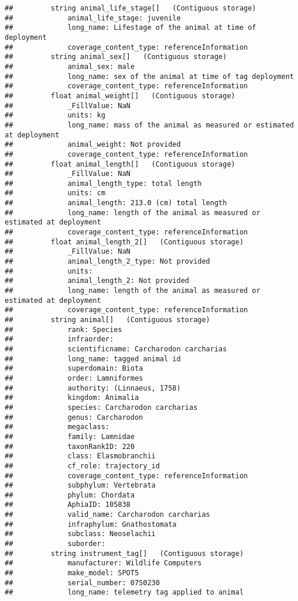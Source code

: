 \documentclass[
]{book}
\begin{document}
\begin{verbatim}
##         string animal_life_stage[]   (Contiguous storage)  
##             animal_life_stage: juvenile
##             long_name: Lifestage of the animal at time of deployment 
##             coverage_content_type: referenceInformation
##         string animal_sex[]   (Contiguous storage)  
##             animal_sex: male
##             long_name: sex of the animal at time of tag deployment
##             coverage_content_type: referenceInformation
##         float animal_weight[]   (Contiguous storage)  
##             _FillValue: NaN
##             units: kg
##             long_name: mass of the animal as measured or estimated at deployment
##             animal_weight: Not provided
##             coverage_content_type: referenceInformation
##         float animal_length[]   (Contiguous storage)  
##             _FillValue: NaN
##             animal_length_type: total length
##             units: cm
##             animal_length: 213.0 (cm) total length
##             long_name: length of the animal as measured or estimated at deployment
##             coverage_content_type: referenceInformation
##         float animal_length_2[]   (Contiguous storage)  
##             _FillValue: NaN
##             animal_length_2_type: Not provided
##             units: 
##             animal_length_2: Not provided
##             long_name: length of the animal as measured or estimated at deployment
##             coverage_content_type: referenceInformation
##         string animal[]   (Contiguous storage)  
##             rank: Species
##             infraorder: 
##             scientificname: Carcharodon carcharias
##             long_name: tagged animal id
##             superdomain: Biota
##             order: Lamniformes
##             authority: (Linnaeus, 1758)
##             kingdom: Animalia
##             species: Carcharodon carcharias
##             genus: Carcharodon
##             megaclass: 
##             family: Lamnidae
##             taxonRankID: 220
##             class: Elasmobranchii
##             cf_role: trajectory_id
##             coverage_content_type: referenceInformation
##             subphylum: Vertebrata
##             phylum: Chordata
##             AphiaID: 105838
##             valid_name: Carcharodon carcharias
##             infraphylum: Gnathostomata
##             subclass: Neoselachii
##             suborder: 
##         string instrument_tag[]   (Contiguous storage)  
##             manufacturer: Wildlife Computers
##             make_model: SPOT5
##             serial_number: 07S0230
##             long_name: telemetry tag applied to animal

\end{verbatim}
\end{document}
